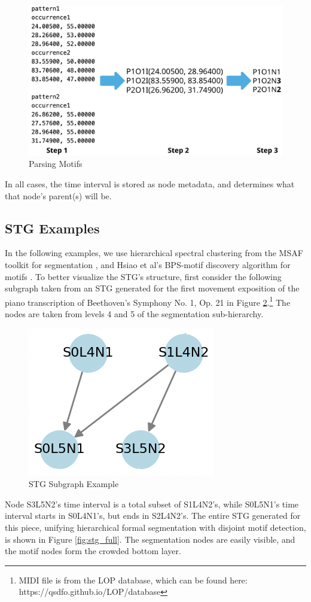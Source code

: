 \documentclass{article}
\begin{document}
\begin{figure}[h!]
  \centering
  \includegraphics[width=\linewidth]{figs/motif_parse}
  \caption{Parsing Motifs}
  \label{fig:motif_parse}
\end{figure}

In all cases, the time interval is stored as node metadata, and determines what that node's parent(s) will be.

\subsection{STG Examples}\label{subsec:stg_ex}

In the following examples, we use hierarchical spectral clustering from the MSAF toolkit for segmentation \cite{msaf, scluster}, and Hsiao et al's BPS-motif discovery algorithm for motifs \cite{Hsiao_2023_motifs}. To better visualize the STG's structure, first consider the following subgraph taken from an STG generated for the first movement exposition of the piano transcription of Beethoven's Symphony No. 1, Op. 21 in Figure \ref{fig:stg_ex}.\footnote{MIDI file is from the LOP database, which can be found here: https://qsdfo.github.io/LOP/database} The nodes are taken from levels 4 and 5 of the segmentation sub-hierarchy.
\begin{figure}[h!]
  \centering
  \includegraphics[width=0.45\linewidth]{figs/stg_example}
  \caption{STG Subgraph Example}
  \label{fig:stg_ex}
\end{figure}
Node S3L5N2’s time interval is a total subset of S1L4N2's, while S0L5N1’s time interval starts in S0L4N1’s, but ends in S2L4N2’s. The entire STG generated for this piece, unifying hierarchical formal segmentation with disjoint motif detection, is shown in Figure \ref{fig:stg_full}. The segmentation nodes are easily visible, and the motif nodes form the crowded bottom layer.
\end{document}
